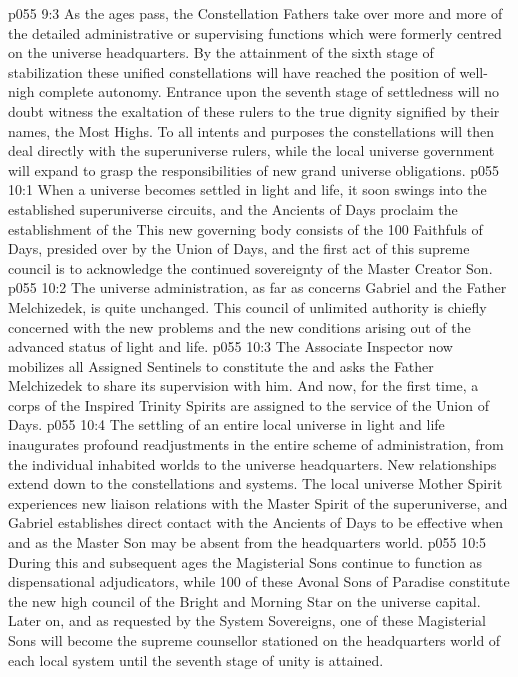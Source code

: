 \vs p055 9:3 As the ages pass, the Constellation Fathers take over more and more of the detailed administrative or supervising functions which were formerly centred on the universe headquarters. By the attainment of the sixth stage of stabilization these unified constellations will have reached the position of well\hyp{}nigh complete autonomy. Entrance upon the seventh stage of settledness will no doubt witness the exaltation of these rulers to the true dignity signified by their names, the Most Highs. To all intents and purposes the constellations will then deal directly with the superuniverse rulers, while the local universe government will expand to grasp the responsibilities of new grand universe obligations.
\vs p055 10:1 When a universe becomes settled in light and life, it soon swings into the established superuniverse circuits, and the Ancients of Days proclaim the establishment of the  This new governing body consists of the 100 Faithfuls of Days, presided over by the Union of Days, and the first act of this supreme council is to acknowledge the continued sovereignty of the Master Creator Son.
\vs p055 10:2 The universe administration, as far as concerns Gabriel and the Father Melchizedek, is quite unchanged. This council of unlimited authority is chiefly concerned with the new problems and the new conditions arising out of the advanced status of light and life.
\vs p055 10:3 \pc The Associate Inspector now mobilizes all Assigned Sentinels to constitute the  and asks the Father Melchizedek to share its supervision with him. And now, for the first time, a corps of the Inspired Trinity Spirits are assigned to the service of the Union of Days.
\vs p055 10:4 \pc The settling of an entire local universe in light and life inaugurates profound readjustments in the entire scheme of administration, from the individual inhabited worlds to the universe headquarters. New relationships extend down to the constellations and systems. The local universe Mother Spirit experiences new liaison relations with the Master Spirit of the superuniverse, and Gabriel establishes direct contact with the Ancients of Days to be effective when and as the Master Son may be absent from the headquarters world.
\vs p055 10:5 During this and subsequent ages the Magisterial Sons continue to function as dispensational adjudicators, while 100 of these Avonal Sons of Paradise constitute the new high council of the Bright and Morning Star on the universe capital. Later on, and as requested by the System Sovereigns, one of these Magisterial Sons will become the supreme counsellor stationed on the headquarters world of each local system until the seventh stage of unity is attained.
